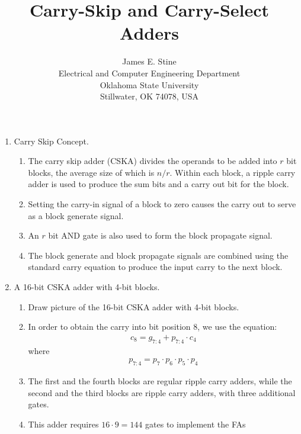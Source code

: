 \documentclass[times, twocolumn, 10pt]{article}
\begin{document}
\title{Carry-Skip and Carry-Select Adders}
\author{James E. Stine \\
Electrical and Computer Engineering Department\\
Oklahoma State University \\
Stillwater, OK 74078, USA}
\date{}

\maketitle

\begin{enumerate}
\item Carry Skip Concept. 
  \begin{enumerate}
  \item The carry skip adder (CSKA) divides the operands to be added into $r$ bit 
    blocks, the average size of which is $n/r$. Within each block, a ripple 
    carry adder is used to produce the sum bits and a carry out
    bit for the block. 
  \item Setting the carry-in signal of a block to zero causes the carry out 
    to serve as a block generate signal. 
  \item An $r$ bit AND gate is also used to form the block propagate signal. 
  \item The block generate and block propagate signals are combined using
    the standard carry equation to produce the input carry to the next 
    block. 
  \end{enumerate}
\item A 16-bit CSKA adder with 4-bit blocks. 
  \begin{enumerate}
  \item Draw picture of the 16-bit CSKA adder with 4-bit blocks. 
  \item In order to obtain the carry into bit position 8, we use the 
    equation:
    \begin{eqnarray*}
      c_{8} = g_{7:4} + p_{7:4} \cdot c_{4} 
    \end{eqnarray*}
    where 
    \begin{eqnarray*}
      p_{7:4} = p_{7} \cdot p_{6} \cdot p_{5} \cdot p_{4}
    \end{eqnarray*}
  \item The first and the fourth blocks are regular ripple carry adders, 
    while the second and the third blocks are ripple carry adders, 
    with three additional gates. 
  \item This adder requires $16 \cdot 9 = 144$ gates to implement the FAs

\end{enumerate}
\end{enumerate}
\end{document}
